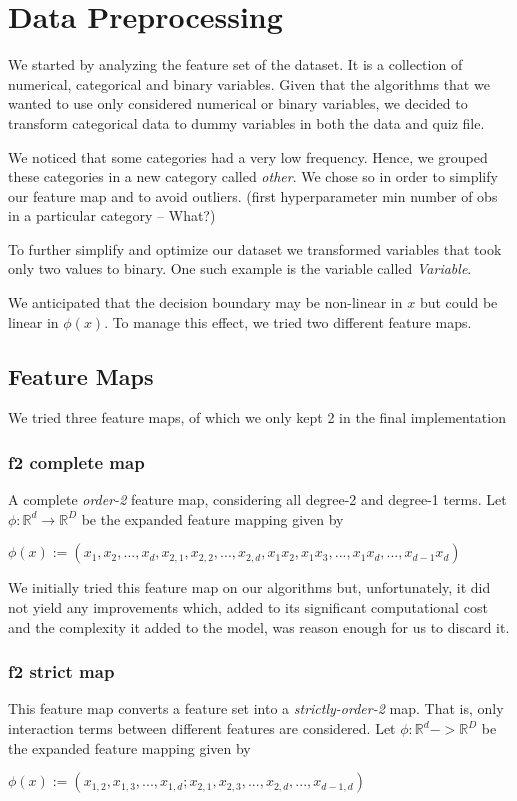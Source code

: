 \chapter{Data Preprocessing}
We started by analyzing the feature set of the dataset. It is a collection of numerical, categorical and binary variables.
Given that the algorithms that we wanted to use only considered numerical or binary variables, we decided to transform categorical data to dummy variables in both the data and quiz file.

We noticed that some categories had a very low frequency. Hence, we grouped these categories in a new category called \textit{other}. We chose so in order to simplify our feature map and to avoid outliers.  (first hyperparameter min number of obs in a particular category -- What?) 

To further simplify and optimize our dataset we transformed variables that took only two values to binary. One such example is the variable called \textit{Variable}.

We anticipated that the decision boundary may be non-linear in $x$ but could be linear in $\phi(x)$.
To manage this effect, we tried two different feature maps.


\section{Feature Maps}
We tried three feature maps, of which we only kept 2 in the final implementation
\subsection{f2 complete map}
A complete \textit{order-2} feature map, considering all degree-2 and degree-1 terms. Let 
$\phi : \mathbb{R}^d \rightarrow \mathbb{R}^D$ be the expanded feature mapping given by 
\begin{center}
$\phi(x) := (x_1, x_2, ... , x_d, x_{2,1}, x_{2,2}, ... , x_{2,d}, x_1x_2, x_1x_3, ... , x_1x_d, ... ,x_{d-1}x_d)$
 \end{center}
 
We initially tried this feature map on our algorithms but, unfortunately, it did not yield any improvements which, added to its significant computational cost and the complexity it added to the model, was reason enough for us to discard it.

\subsection{f2 strict map}
 This feature map converts a feature set into a \textit{strictly-order-2} map. That is, only interaction terms between different features are considered. Let $\phi : \mathbb{R}^d -> \mathbb{R}^D$ be the expanded feature mapping given by \newline
 \begin{center}
 $\phi(x) := (x_{1,2}, x_{1,3}, ... , x_{1,d}; x_{2,1}, x_{2,3}, ... , x_{2,d}, ... ,x_{d-1,d}) $
 \end{center}

